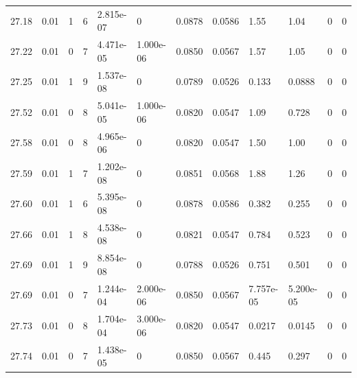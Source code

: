 \documentclass[preview]{standalone}
\begin{document}
{{{{{{{\begin{tabular}{L{1.2cm}C{1.2cm} C{0.3cm}C{0.5cm} C{1.4cm}C{1.4cm} C{1.4cm}C{1.4cm} C{1.6cm}C{1.6cm} C{1.6cm}C{1.6cm}}
  27.18  &  0.01  & 1     &  6 &  2.815e-07  & 0  &  0.0878&   0.0586& 1.55 & 1.04   &  0 & 0  \\ 
  27.22  &  0.01  & 0     &  7 &  4.471e-05  & 1.000e-06  &  0.0850&   0.0567& 1.57 & 1.05   &  0 & 0  \\ 
  27.25  &  0.01  & 1     &  9 &  1.537e-08  & 0  &  0.0789&   0.0526& 0.133 & 0.0888   &  0 & 0  \\ 
  27.52  &  0.01  & 0     &  8 &  5.041e-05  & 1.000e-06  &  0.0820&   0.0547& 1.09 & 0.728   &  0 & 0  \\ 
  27.58  &  0.01  & 0     &  8 &  4.965e-06  & 0  &  0.0820&   0.0547& 1.50 & 1.00   &  0 & 0  \\ 
  27.59  &  0.01  & 1     &  7 &  1.202e-08  & 0  &  0.0851&   0.0568& 1.88 & 1.26   &  0 & 0  \\ 
  27.60  &  0.01  & 1     &  6 &  5.395e-08  & 0  &  0.0878&   0.0586& 0.382 & 0.255   &  0 & 0  \\ 
  27.66  &  0.01  & 1     &  8 &  4.538e-08  & 0  &  0.0821&   0.0547& 0.784 & 0.523   &  0 & 0  \\ 
  27.69  &  0.01  & 1     &  9 &  8.854e-08  & 0  &  0.0788&   0.0526& 0.751 & 0.501   &  0 & 0  \\ 
  27.69  &  0.01  & 0     &  7 &  1.244e-04  & 2.000e-06  &  0.0850&   0.0567& 7.757e-05 & 5.200e-05   &  0 & 0  \\ 
  27.73  &  0.01  & 0     &  8 &  1.704e-04  & 3.000e-06  &  0.0820&   0.0547& 0.0217 & 0.0145   &  0 & 0  \\ 
  27.74  &  0.01  & 0     &  7 &  1.438e-05  & 0  &  0.0850&   0.0567& 0.445 & 0.297   &  0 & 0  \\ 
\hline 
\end{tabular} 

}}}}}}}
\end{document}
